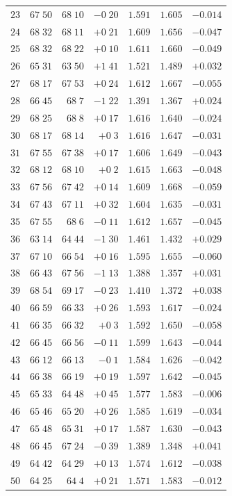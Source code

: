 \begin{center}
\begin{tabular}{r||r|r|r||r|r|r}
$23$&$67\;50$&$68\;10$&$-0\;20$&$1.591$&$1.605$&$-0.014$\\
$24$&$68\;32$&$68\;11$&$+0\;21$&$1.609$&$1.656$&$-0.047$\\
$25$&$68\;32$&$68\;22$&$+0\;10$&$1.611$&$1.660$&$-0.049$\\
$26$&$65\;31$&$63\;50$&$+1\;41$&$1.521$&$1.489$&$+0.032$\\
$27$&$68\;17$&$67\;53$&$+0\;24$&$1.612$&$1.667$&$-0.055$\\
$28$&$66\;45$&$68\;7$&$-1\;22$&$1.391$&$1.367$&$+0.024$\\
$29$&$68\;25$&$68\;8$&$+0\;17$&$1.616$&$1.640$&$-0.024$\\
$30$&$68\;17$&$68\;14$&$+0\;3$&$1.616$&$1.647$&$-0.031$\\[2pt]
$31$&$67\;55$&$67\;38$&$+0\;17$&$1.606$&$1.649$&$-0.043$\\
$32$&$68\;12$&$68\;10$&$+0\;2$&$1.615$&$1.663$&$-0.048$\\
$33$&$67\;56$&$67\;42$&$+0\;14$&$1.609$&$1.668$&$-0.059$\\
$34$&$67\;43$&$67\;11$&$+0\;32$&$1.604$&$1.635$&$-0.031$\\
$35$&$67\;55$&$68\;6$&$-0\;11$&$1.612$&$1.657$&$-0.045$\\
$36$&$63\;14$&$64\;44$&$-1\;30$&$1.461$&$1.432$&$+0.029$\\
$37$&$67\;10$&$66\;54$&$+0\;16$&$1.595$&$1.655$&$-0.060$\\
$38$&$66\;43$&$67\;56$&$-1\;13$&$1.388$&$1.357$&$+0.031$\\
$39$&$68\;54$&$69\;17$&$-0\;23$&$1.410$&$1.372$&$+0.038$\\
$40$&$66\;59$&$66\;33$&$+0\;26$&$1.593$&$1.617$&$-0.024$\\[2pt]
$41$&$66\;35$&$66\;32$&$+0\;3$&$1.592$&$1.650$&$-0.058$\\
$42$&$66\;45$&$66\;56$&$-0\;11$&$1.599$&$1.643$&$-0.044$\\
$43$&$66\;12$&$66\;13$&$-0\;1$&$1.584$&$1.626$&$-0.042$\\
$44$&$66\;38$&$66\;19$&$+0\;19$&$1.597$&$1.642$&$-0.045$\\
$45$&$65\;33$&$64\;48$&$+0\;45$&$1.577$&$1.583$&$-0.006$\\
$46$&$65\;46$&$65\;20$&$+0\;26$&$1.585$&$1.619$&$-0.034$\\
$47$&$65\;48$&$65\;31$&$+0\;17$&$1.587$&$1.630$&$-0.043$\\
$48$&$66\;45$&$67\;24$&$-0\;39$&$1.389$&$1.348$&$+0.041$\\
$49$&$64\;42$&$64\;29$&$+0\;13$&$1.574$&$1.612$&$-0.038$\\
$50$&$64\;25$&$64\;4$&$+0\;21$&$1.571$&$1.583$&$-0.012$\\
\hline
\end{tabular}
\end{center}
\endgroup

